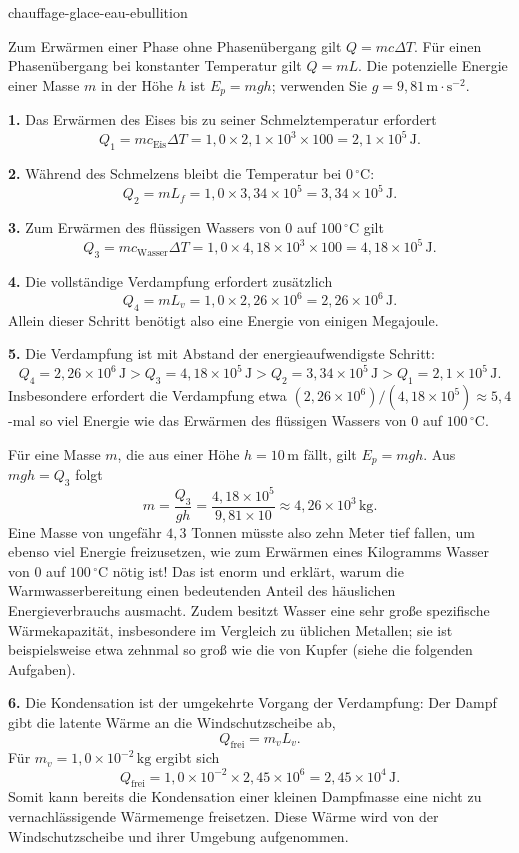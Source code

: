 \begin{exo}{chauffage-glace-eau-ebullition}
\begin{indication}
Zum Erwärmen einer Phase ohne Phasenübergang gilt $Q=mc\Delta T$. Für einen Phasenübergang bei konstanter Temperatur gilt $Q=mL$. Die potenzielle Energie einer Masse $m$ in der Höhe $h$ ist $E_p=mgh$; verwenden Sie $g=9{,}81\,\text{m}\!\cdot\!\text{s}^{-2}$.
\end{indication}

\begin{solution}
\textbf{1.} Das Erwärmen des Eises bis zu seiner Schmelztemperatur erfordert
\[
Q_1=mc_{\text{Eis}}\Delta T
=1{,}0\times2{,}1\times10^3\times100
=2{,}1\times10^5\,\text{J}.
\]

\textbf{2.} Während des Schmelzens bleibt die Temperatur bei $0\,{}^\circ\text{C}$:
\[
Q_2=mL_f=1{,}0\times3{,}34\times10^5
=3{,}34\times10^5\,\text{J}.
\]

\textbf{3.} Zum Erwärmen des flüssigen Wassers von $0$ auf $100\,{}^\circ\text{C}$ gilt
\[
Q_3=mc_{\text{Wasser}}\Delta T
=1{,}0\times4{,}18\times10^3\times100
=4{,}18\times10^5\,\text{J}.
\]

\textbf{4.} Die vollständige Verdampfung erfordert zusätzlich
\[
Q_4=mL_v=1{,}0\times2{,}26\times10^6
=2{,}26\times10^6\,\text{J}.
\]
Allein dieser Schritt benötigt also eine Energie von einigen Megajoule.

\textbf{5.} Die Verdampfung ist mit Abstand der energieaufwendigste Schritt:
\[
Q_4=2{,}26\times10^6\,\text{J}
>Q_3=4{,}18\times10^5\,\text{J}
>Q_2=3{,}34\times10^5\,\text{J}
>Q_1=2{,}1\times10^5\,\text{J}.
\]
Insbesondere erfordert die Verdampfung etwa $(2{,}26\times10^6)/(4{,}18\times10^5)\approx5{,}4$-mal so viel Energie wie das Erwärmen des flüssigen Wassers von $0$ auf $100\,{}^\circ\text{C}$.

Für eine Masse $m$, die aus einer Höhe $h=10\,\text{m}$ fällt, gilt $E_p=mgh$. Aus $mgh=Q_3$ folgt
\[
m=\frac{Q_3}{gh}
=\frac{4{,}18\times10^5}{9{,}81\times10}
\approx4{,}26\times10^3\,\text{kg}.
\]
Eine Masse von ungefähr $4{,}3$ Tonnen müsste also zehn Meter tief fallen, um ebenso viel Energie freizusetzen, wie zum Erwärmen eines Kilogramms Wasser von $0$ auf $100\,{}^\circ\text{C}$ nötig ist! Das ist enorm und erklärt, warum die Warmwasserbereitung einen bedeutenden Anteil des häuslichen Energieverbrauchs ausmacht. Zudem besitzt Wasser eine sehr große spezifische Wärmekapazität, insbesondere im Vergleich zu üblichen Metallen; sie ist beispielsweise etwa zehnmal so groß wie die von Kupfer (siehe die folgenden Aufgaben).

\textbf{6.} Die Kondensation ist der umgekehrte Vorgang der Verdampfung: Der Dampf gibt die latente Wärme an die Windschutzscheibe ab,
\[
Q_{\text{frei}}=m_vL_v.
\]
Für $m_v=1{,}0\times10^{-2}\,\text{kg}$ ergibt sich
\[
Q_{\text{frei}}=1{,}0\times10^{-2}\times2{,}45\times10^6
=2{,}45\times10^4\,\text{J}.
\]
Somit kann bereits die Kondensation einer kleinen Dampfmasse eine nicht zu vernachlässigende Wärmemenge freisetzen. Diese Wärme wird von der Windschutzscheibe und ihrer Umgebung aufgenommen.
\end{solution}
\end{exo}
